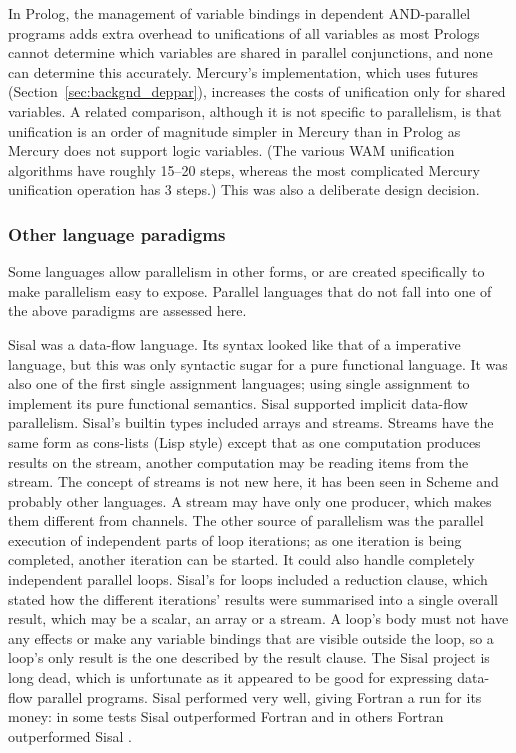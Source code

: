 In Prolog, the management of variable bindings in dependent AND-parallel
programs adds extra overhead to unifications of all variables
as most Prologs cannot determine which variables are shared in parallel
conjunctions,
and none can determine this accurately.
Mercury's implementation,
which uses futures (Section~\ref{sec:backgnd_deppar}),
increases the costs of unification only for shared variables.
A related comparison, although it is not specific to parallelism,
is that unification is an order of magnitude simpler in Mercury than in
Prolog as Mercury does not support logic variables.
(The various WAM unification algorithms have roughly 15--20 steps,
whereas the most complicated Mercury unification operation has 3 steps.)
This was also a deliberate design decision.

\subsubsection{Other language paradigms}
\label{sec:intro_par_other}

Some languages allow parallelism in other forms,
or are created specifically to make parallelism easy to expose.
Parallel languages that do not fall into one of the above paradigms are
assessed here.

Sisal \citep{feo:1990:sisal-report} was a data-flow language.
Its syntax looked like that of a imperative language,
but this was only syntactic sugar for a pure functional language.
It was also one of the first single assignment languages;
using single assignment to implement its pure functional semantics.
Sisal supported implicit data-flow parallelism.
Sisal's builtin types included arrays and streams.
Streams have the same form as cons-lists (Lisp style) except that as one
computation produces results on the stream, another computation may be
reading items from the stream.
The concept of streams is not new here,
it has been seen in Scheme \citep{wizard-book} and probably other
languages.
A stream may have only one producer,
which makes them different from channels.
The other source of parallelism was the parallel execution of independent
parts of loop iterations;
as one iteration is being completed,
another iteration can be started.
It could also handle completely independent parallel loops.
Sisal's for loops included a reduction clause,
which stated how the different iterations' results were summarised into a
single overall result,
which may be a scalar, an array or a stream.
A loop's body must not have any effects or make any variable bindings
that are visible outside the loop,
so a loop's only result is the one described by the result clause.
The Sisal project is long dead,
which is unfortunate as it appeared to be good for expressing data-flow
parallel programs.
Sisal performed very well,
giving Fortran a run for its money:
in some tests Sisal outperformed Fortran and in others Fortran outperformed
Sisal \citep{feo:1990:sisal-report}.

